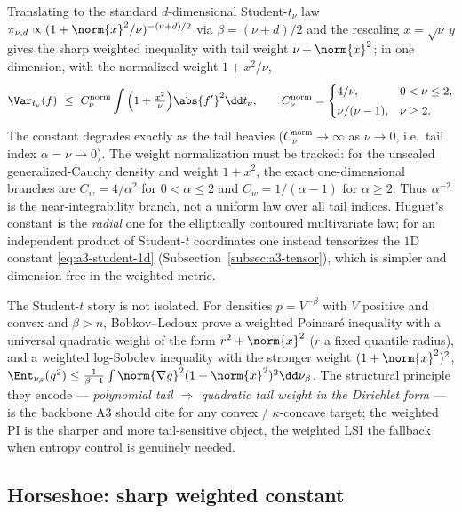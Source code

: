 \documentclass[../../main.tex]{subfiles}
\begin{document}
Translating to the standard $d$-dimensional Student-$t_\nu$ law
$\pi_{\nu,d}\propto(1+\norm{x}^2/\nu)^{-(\nu+d)/2}$ via $\beta=(\nu+d)/2$ and the rescaling
$x=\sqrt\nu\,y$ gives the sharp weighted inequality with tail weight $\nu+\norm{x}^2$; in one
dimension, with the normalized weight $1+x^2/\nu$,
\begin{equation}\label{eq:a3-student-1d}
  \Var_{t_\nu}(f)\ \le\ C_{\nu}^{\mathrm{norm}}\int\Big(1+\tfrac{x^2}{\nu}\Big)\abs{f'}^2\dd t_\nu,
  \qquad
  C_\nu^{\mathrm{norm}}=
  \begin{cases}
    4/\nu, & 0<\nu\le2,\\[1mm]
    \nu/(\nu-1), & \nu\ge2.
  \end{cases}
\end{equation}
The constant degrades exactly as the tail heavies ($C_\nu^{\mathrm{norm}}\to\infty$ as $\nu\to0$,
i.e.\ tail index $\alpha=\nu\to0$). The weight normalization must be tracked: for the unscaled
generalized-Cauchy density and weight $1+x^2$, the exact one-dimensional branches are
$C_w=4/\alpha^2$ for $0<\alpha\le2$ and $C_w=1/(\alpha-1)$ for $\alpha\ge2$. Thus
$\alpha^{-2}$ is the near-integrability branch, not a uniform law over all tail indices.
Huguet's constant is the \emph{radial} one for the elliptically contoured multivariate law; for an independent product of
Student-$t$ coordinates one instead tensorizes the $1$D constant \eqref{eq:a3-student-1d}
(Subsection~\ref{subsec:a3-tensor}), which is simpler and dimension-free in the weighted metric.

\begin{remark}
\label{rem:a3-bobkovledoux}
The Student-$t$ story is not isolated. For densities $p=V^{-\beta}$ with $V$ positive and convex
and $\beta>n$, Bobkov--Ledoux \cite{BobkovLedoux2009} prove a weighted Poincar\'e inequality with
a universal quadratic weight of the form $r^2+\norm{x}^2$ ($r$ a fixed quantile radius), and a
weighted log-Sobolev inequality with the stronger weight $(1+\norm{x}^2)^2$,
$\Ent_{\nu_\beta}(g^2)\le\frac1{\beta-1}\int\norm{\nabla g}^2(1+\norm{x}^2)^2\dd\nu_\beta$. The
structural principle they encode --- \emph{polynomial tail $\Rightarrow$ quadratic tail weight in
the Dirichlet form} --- is the backbone A3 should cite for any convex / $\kappa$-concave target;
the weighted PI is the sharper and more tail-sensitive object, the weighted LSI the fallback when
entropy control is genuinely needed.
\end{remark}

\subsection{Horseshoe: sharp weighted constant}
\label{subsec:a3-horseshoe}
\end{document}
